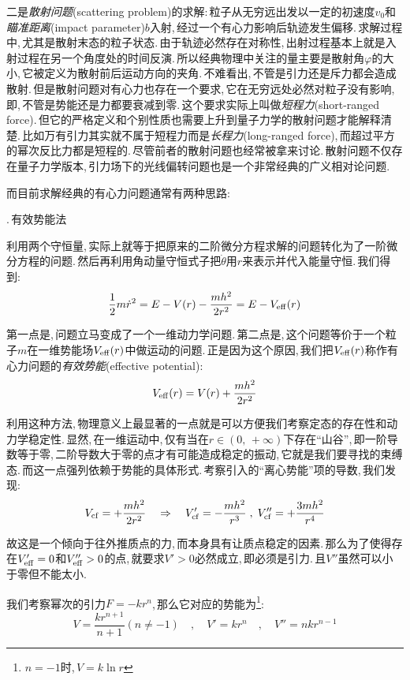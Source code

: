 二是\emph{散射问题}(scattering problem)的求解:\,粒子从无穷远出发以一定的初速度$v_0$和\emph{瞄准距离}(impact parameter)$b$入射,\,经过一个有心力影响后轨迹发生偏移.\,求解过程中,\,尤其是散射末态的粒子状态.\,由于轨迹必然存在对称性,\,出射过程基本上就是入射过程在另一个角度处的时间反演.\,所以经典物理中关注的量主要是散射角$\varphi$的大小,\,它被定义为散射前后运动方向的夹角.\,不难看出,\,不管是引力还是斥力都会造成散射.\,但是散射问题对有心力也存在一个要求,\,它在无穷远处必然对粒子没有影响,\,即,\,不管是势能还是力都要衰减到零.\,这个要求实际上叫做\emph{短程力}(short-ranged force).\,但它的严格定义和个别性质也需要上升到量子力学的散射问题才能解释清楚.\,比如万有引力其实就不属于短程力而是\emph{长程力}(long-ranged force),\,而超过平方的幂次反比力都是短程的.\,尽管前者的散射问题也经常被拿来讨论.\,散射问题不仅存在量子力学版本,\,引力场下的光线偏转问题也是一个非常经典的广义相对论问题.\

而目前求解经典的有心力问题通常有两种思路:

\vspace{0.5cm}

{.\,有效势能法}

\vspace{0.2cm}


利用两个守恒量,\,实际上就等于把原来的二阶微分方程求解的问题转化为了一阶微分方程的问题.\,然后再利用角动量守恒式子把$\dot{\theta}$用$r$来表示并代入能量守恒.\,我们得到:
\[\frac{1}{2}m\dot{r}^2=E-V(r)-\frac{mh^2}{2r^2}=E-V_{\rm eff}(r)\]

第一点是,\,问题立马变成了一个一维动力学问题.\,第二点是,\,这个问题等价于一个粒子$m$在一维势能场$V_{\rm eff}(r)$中做运动的问题.\,正是因为这个原因,\,我们把$V_{\rm eff}(r)$称作有心力问题的\emph{有效势能}(effective potential):
\[V_{\rm eff}(r)=V(r)+\frac{mh^2}{2r^2}\]

利用这种方法,\,物理意义上最显著的一点就是可以方便我们考察定态的存在性和动力学稳定性.\,显然,\,在一维运动中,\,仅有当在$r\in(0,\,+\infty)$下存在``山谷'',\,即一阶导数等于零,\,二阶导数大于零的点才有可能造成稳定的振动,\,它就是我们要寻找的束缚态.\,而这一点强列依赖于势能的具体形式.\,考察引入的``离心势能''项的导数,\,我们发现:
\[V_{\rm cf}=+\frac{mh^2}{2r^2}\quad \Rightarrow\quad V_{\rm cf}'=-\frac{mh^2}{r^3}\;,\;V_{\rm cf}''=+\frac{3mh^2}{r^4}\]

故这是一个倾向于往外推质点的力,\,而本身具有让质点稳定的因素.\,那么为了使得存在$V_{\rm eff}'=0$和$V_{\rm eff}''>0$的点,\,就要求$V'>0$必然成立,\,即必须是引力.\,且$V''$虽然可以小于零但不能太小.

我们考察幂次的引力$F=-kr^n$,\,那么它对应的势能为\footnote{$n=-1$时,\,$V=k\ln r$}:
\[V=\frac{kr^{n+1}}{n+1}(n\neq -1)\quad ,\quad V'=kr^n \quad ,\quad V''=nkr^{n-1}\]

